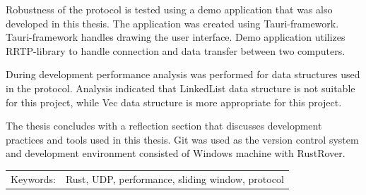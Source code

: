 \documentclass[a4paper,12pt]{article}
\begin{document}
\begin{titlepage}
\begin{singlespace}
        Robustness of the protocol is tested using a demo application that was also developed in this thesis. The application was created using Tauri-framework. Tauri-framework handles drawing the user interface. Demo application utilizes RRTP-library to handle connection and data transfer between two computers. \par

        During development performance analysis was performed for data structures used in the protocol. Analysis indicated that LinkedList data structure is not suitable for this project, while Vec data structure is more appropriate for this project.
        \par

        The thesis concludes with a reflection section that discusses development practices and tools used in this thesis. Git was used as the version control system and development environment consisted of Windows machine with RustRover.

\end{singlespace}

        \begin{tabular} {p{5cm} l}
            Keywords: & Rust, UDP, performance, sliding window, protocol \\
        \end{tabular}
        \newpage

        \tableofcontents
        \newpage
        
        

\end{titlepage}
\end{document}
